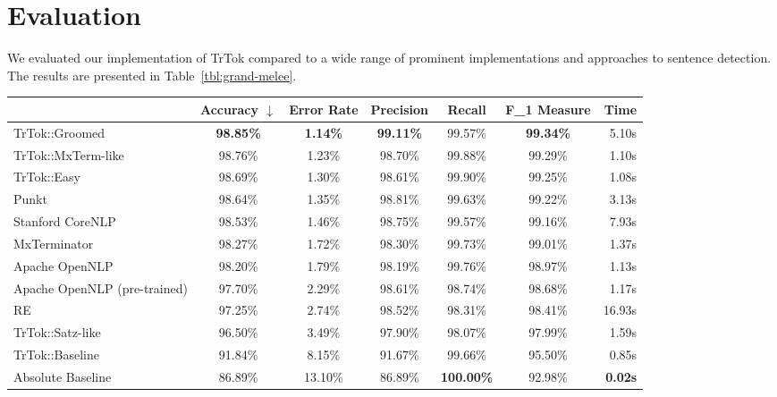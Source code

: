 \section{Evaluation}
\label{sec:eval}

We evaluated our implementation of TrTok compared to a wide range of
prominent implementations and approaches to sentence detection. The
results are presented in Table~\ref{tbl:grand-melee}.

\begin{table*}
  \begin{center}
    \begin{tabular}{ | l | c | c | c | c | c | r | }
      \hline
      & Accuracy $\downarrow$ & Error Rate & Precision
      & Recall & F_1 Measure & Time \\ \hline
      TrTok::Groomed & \textbf{98.85\%} & \textbf{1.14\%} & \textbf{99.11\%}
                     & 99.57\% & \textbf{99.34\%} & 5.10s \\ \hline
      TrTok::MxTerm-like & 98.76\% & 1.23\% & 98.70\%
                         & 99.88\% & 99.29\% & 1.10s \\ \hline
      TrTok::Easy & 98.69\% & 1.30\% & 98.61\%
                  & 99.90\% & 99.25\% & 1.08s \\ \hline
      Punkt & 98.64\% & 1.35\% & 98.81\%
            & 99.63\% & 99.22\% & 3.13s \\ \hline
      Stanford CoreNLP & 98.53\% & 1.46\% & 98.75\%
                       & 99.57\% & 99.16\% & 7.93s \\ \hline
      MxTerminator & 98.27\% & 1.72\% & 98.30\%
                   & 99.73\% & 99.01\% & 1.37s \\ \hline
      Apache OpenNLP & 98.20\% & 1.79\% & 98.19\%
                     & 99.76\% & 98.97\% & 1.13s \\ \hline
      Apache OpenNLP (pre-trained) & 97.70\% & 2.29\% & 98.61\%
                                   & 98.74\% & 98.68\% & 1.17s \\ \hline
      RE & 97.25\% & 2.74\% & 98.52\%
         & 98.31\% & 98.41\% & 16.93s \\ \hline
      TrTok::Satz-like & 96.50\% & 3.49\% & 97.90\%
                       & 98.07\% & 97.99\% & 1.59s \\ \hline
      TrTok::Baseline & 91.84\% & 8.15\% & 91.67\%
                      & 99.66\% & 95.50\% & 0.85s \\ \hline
      Absolute Baseline & 86.89\% & 13.10\% & 86.89\%
                        & \textbf{100.00\%} & 92.98\% & \textbf{0.02s} \\ \hline
    \end{tabular}
  \end{center}
  \caption[Performance of sentence detectors on the Brown corpus] {The
    performance of the various sentence detectors on full stops from
    the Brown corpus testing data. \\ The 1.15 MB of testing data
    consisted of 11376 sentences and 232893 tokens.}
  \label{tbl:grand-melee}
\end{table*}

